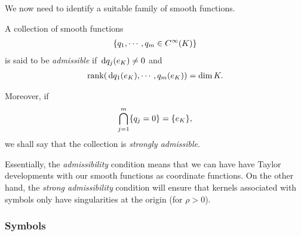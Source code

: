 We now need to identify a suitable family of smooth functions.

\begin{definition}[Admissibility]
    A collection of smooth functions
    \begin{align*}
        \{q_1, \cdots, q_m \in {C^\infty(K)}\}
    \end{align*}
    is said to be \emph{admissible}
    if $\,\mathrm{d} q_j(e_K) \neq 0$ and
    \begin{align*}
        \operatorname{rank}(\,\mathrm{d} q_1(e_K), \cdots, q_m(e_K))
        = \dim K.
    \end{align*}

    Moreover, if
    \begin{align*}
        \bigcap_{j = 1}^m \{q_j = 0\} = \{e_K\},
    \end{align*}
    we shall say that the collection is \emph{strongly admissible}.
\end{definition}

Essentially, the \emph{admissibility} condition means
that we can have have Taylor developments with our smooth functions as coordinate functions.
On the other hand, the \emph{strong admissibility} condition will ensure
that kernels associated with symbols only have singularities at the origin (for $\rho > 0$).

\subsubsection{Symbols}

